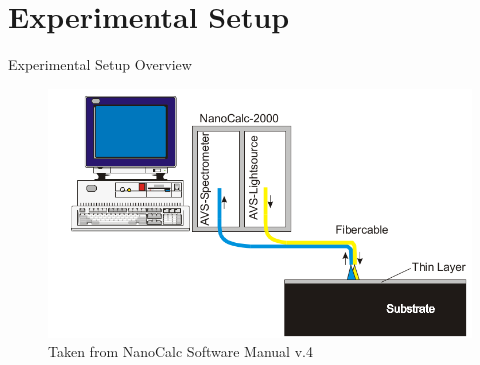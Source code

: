 \documentclass[10pt]{beamer}
\begin{document}
	
	\section{Experimental Setup}
	
\begin{frame}{Experimental Setup Overview}
	\begin{figure}
	\centering
	\includegraphics[width=\textwidth]{nanocalcsetup.png}
	\caption{Taken from NanoCalc Software Manual v.4}
	\end{figure}
\end{frame}	
		
\end{document}
